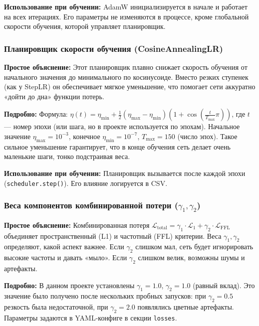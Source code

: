 \documentclass[12pt,a4paper]{article}
\begin{document}
\textbf{Использование при обучении:}  
AdamW инициализируется в начале и работает на всех итерациях. Его параметры не изменяются в процессе, кроме глобальной скорости обучения, которой управляет планировщик.

\subsubsection{Планировщик скорости обучения (CosineAnnealingLR)}

\textbf{Простое объяснение:}  
Этот планировщик плавно снижает скорость обучения от начального значения до минимального по косинусоиде. Вместо резких ступенек (как у StepLR) он обеспечивает мягкое уменьшение, что помогает сети аккуратно «дойти до дна» функции потерь.

\textbf{Подробно:}  
Формула: \(\eta(t) = \eta_{\min} + \frac{1}{2}(\eta_{\max} - \eta_{\min})(1 + \cos(\frac{t}{T_{\max}}\pi))\), где \(t\) — номер эпохи (или шага, но в проекте используется по эпохам). Начальное значение \(\eta_{\max} = 10^{-3}\), конечное \(\eta_{\min} = 10^{-7}\), \(T_{\max} = 150\) (число эпох). Такое сильное уменьшение гарантирует, что в конце обучения сеть делает очень маленькие шаги, тонко подстраивая веса.

\textbf{Использование при обучении:}  
Планировщик вызывается после каждой эпохи (\texttt{scheduler.step()}). Его влияние логируется в CSV.

\subsubsection{Веса компонентов комбинированной потери (\(\gamma_1, \gamma_2\))}

\textbf{Простое объяснение:}  
Комбинированная потеря \(\mathcal{L}_{\text{total}} = \gamma_1 \cdot \mathcal{L}_1 + \gamma_2 \cdot \mathcal{L}_{\text{FFL}}\) объединяет пространственный (L1) и частотный (FFL) критерии. Веса \(\gamma_1, \gamma_2\) определяют, какой аспект важнее. Если \(\gamma_2\) слишком мал, сеть будет игнорировать высокие частоты и давать «мыло». Если \(\gamma_2\) слишком велик, возможны шумы и артефакты.

\textbf{Подробно:}  
В данном проекте установлены \(\gamma_1 = 1.0\), \(\gamma_2 = 1.0\) (равный вклад). Это значение было получено после нескольких пробных запусков: при \(\gamma_2 = 0.5\) резкость была недостаточной, при \(\gamma_2 = 2.0\) появлялись цветные артефакты. Параметры задаются в YAML-конфиге в секции \texttt{losses}.
\end{document}
